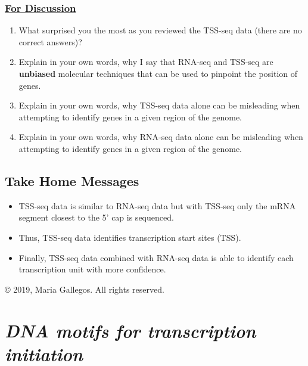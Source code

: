 \documentclass[
]{book}
\providecommand{\tightlist}{%
  \setlength{\itemsep}{0pt}\setlength{\parskip}{0pt}}
\begin{document}
\hypertarget{for-discussion-2}{%
\subsection{\texorpdfstring{\href{https://docs.google.com/forms/d/e/1FAIpQLSeR06s09E1L8aZKmYzKyJwuSNjVxeYzn7mpXPM555K0qOM9Xw/viewform?usp=sf_link}{For Discussion}}{For Discussion}}\label{for-discussion-2}}

\begin{enumerate}
\def\labelenumi{\arabic{enumi}.}
\tightlist
\item
  What surprised you the most as you reviewed the TSS-seq data (there are no correct answers)?
\item
  Explain in your own words, why I say that RNA-seq and TSS-seq are \textbf{unbiased} molecular techniques that can be used to pinpoint the position of genes.
\item
  Explain in your own words, why TSS-seq data alone can be misleading when attempting to identify genes in a given region of the genome.
\item
  Explain in your own words, why RNA-seq data alone can be misleading when attempting to identify genes in a given region of the genome.
\end{enumerate}

\hypertarget{take-home-messages-1}{%
\section{Take Home Messages}\label{take-home-messages-1}}

\begin{itemize}
\tightlist
\item
  TSS-seq data is similar to RNA-seq data but with TSS-seq only the mRNA segment closest to the 5' cap is sequenced.
\item
  Thus, TSS-seq data identifies transcription start sites (TSS).
\item
  Finally, TSS-seq data combined with RNA-seq data is able to identify each transcription unit with more confidence.
\end{itemize}

© 2019, Maria Gallegos. All rights reserved.

\hypertarget{dna-motifs-for-transcription-initiation}{%
\chapter{\texorpdfstring{\emph{DNA motifs for transcription initiation}}{DNA motifs for transcription initiation}}\label{dna-motifs-for-transcription-initiation}}
\end{document}

